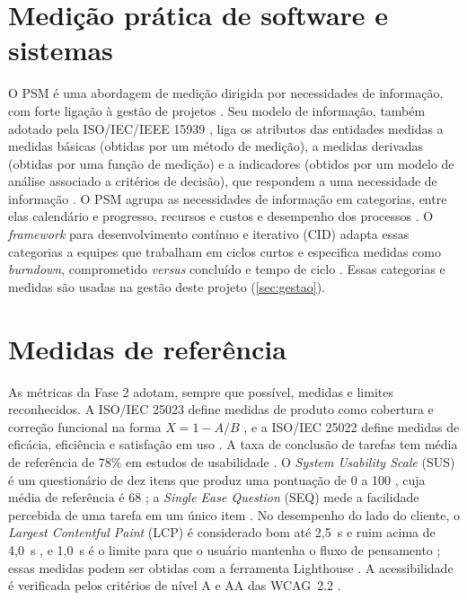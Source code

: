 \section{Medição prática de software e sistemas}
\label{sec:psm}

O PSM é uma abordagem de medição dirigida por necessidades de informação, com forte ligação à gestão de projetos \cite{mcgarry2002}. Seu modelo de informação, também adotado pela ISO/IEC/IEEE 15939 \cite{iso15939}, liga os atributos das entidades medidas a medidas básicas (obtidas por um método de medição), a medidas derivadas (obtidas por uma função de medição) e a indicadores (obtidos por um modelo de análise associado a critérios de decisão), que respondem a uma necessidade de informação \cite{ramos2026psm}. O PSM agrupa as necessidades de informação em categorias, entre elas calendário e progresso, recursos e custos e desempenho dos processos \cite{mcgarry2002}. O \textit{framework} para desenvolvimento contínuo e iterativo (CID) adapta essas categorias a equipes que trabalham em ciclos curtos e especifica medidas como \textit{burndown}, comprometido \textit{versus} concluído e tempo de ciclo \cite{psmcid1,psmcid2}. Essas categorias e medidas são usadas na gestão deste projeto (\autoref{sec:gestao}).

\section{Medidas de referência}
\label{sec:medidas-referencia}

As métricas da Fase 2 adotam, sempre que possível, medidas e limites reconhecidos. A ISO/IEC 25023 define medidas de produto como cobertura e correção funcional na forma $X = 1 - A/B$ \cite{iso25023}, e a ISO/IEC 25022 define medidas de eficácia, eficiência e satisfação em uso \cite{iso25022}. A taxa de conclusão de tarefas tem média de referência de 78\% em estudos de usabilidade \cite{sauro2011}. O \textit{System Usability Scale} (SUS) é um questionário de dez itens que produz uma pontuação de 0 a 100 \cite{brooke1996}, cuja média de referência é 68 \cite{sauro2016}; a \textit{Single Ease Question} (SEQ) mede a facilidade percebida de uma tarefa em um único item \cite{sauro2016}. No desempenho do lado do cliente, o \textit{Largest Contentful Paint} (LCP) é considerado bom até 2,5~s e ruim acima de 4,0~s \cite{webvitals}, e 1,0~s é o limite para que o usuário mantenha o fluxo de pensamento \cite{nielsen1993}; essas medidas podem ser obtidas com a ferramenta Lighthouse \cite{lighthouse}. A acessibilidade é verificada pelos critérios de nível A e AA das WCAG~2.2 \cite{wcag22}.
